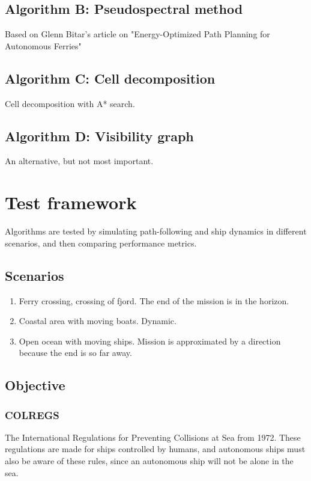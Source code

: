 \subsection{Algorithm B: Pseudospectral method}
Based on Glenn Bitar's article on "Energy-Optimized Path Planning for Autonomous Ferries"

\subsection{Algorithm C: Cell decomposition}
Cell decomposition with A* search.

\subsection{Algorithm D: Visibility graph}
An alternative, but not most important.




\section{Test framework}
Algorithms are tested by simulating path-following and ship dynamics in different scenarios, and then comparing performance metrics.


\subsection{Scenarios}

\begin{enumerate}
	\item Ferry crossing, crossing of fjord. The end of the mission is in the horizon.
	\item Coastal area with moving boats. Dynamic.
	\item Open ocean with moving ships. Mission is approximated by a direction because the end is so far away.
\end{enumerate}


\subsection{Objective}

\subsubsection{COLREGS}
The International Regulations for Preventing Collisions at Sea from 1972. These regulations are made for ships controlled by humans, and autonomous ships must also be aware of these rules, since an autonomous ship will not be alone in the sea.

